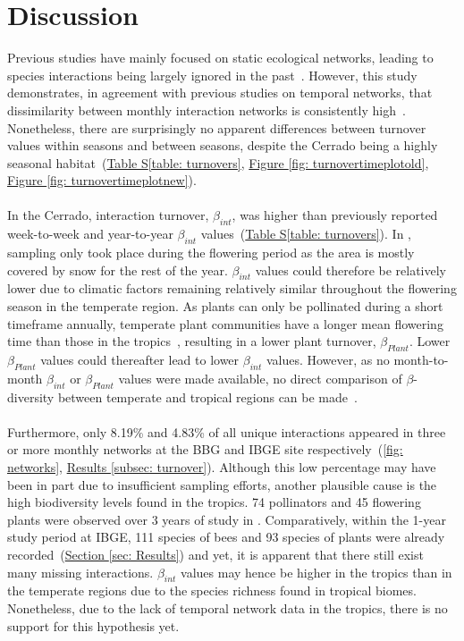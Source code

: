 \documentclass[11pt]{article}
\begin{document}
\newpage
\section{Discussion} %
Previous studies have mainly focused on static ecological networks, leading to species interactions being largely ignored in the past~\citep{Poisot2015}. However, this study demonstrates, in agreement with previous studies on temporal networks, that dissimilarity between monthly interaction networks is consistently high~\citep{Olesen2008, Burkle2013, CaraDonna2017}. Nonetheless, there are surprisingly no apparent differences between turnover values within seasons and between seasons, despite the Cerrado being a highly seasonal habitat~\citep{Kricher2011}(\hyperref[table: turnovers]{Table S\ref{table: turnovers}}, \hyperref[fig: turnovertimeplotold]{Figure \ref{fig: turnovertimeplotold}}, \hyperref[fig: turnovertimeplotnew]{Figure \ref{fig: turnovertimeplotnew}}). \\
\\
In the Cerrado, interaction turnover, $\beta_{int}$, was higher than previously reported week-to-week and year-to-year $\beta_{int}$ values~\citep{CaraDonna2017}(\hyperref[table: turnovers]{Table S\ref{table: turnovers}}). In \cite{CaraDonna2017}, sampling only took place during the flowering period as the area is mostly covered by snow for the rest of the year. $\beta_{int}$ values could therefore be relatively lower due to climatic factors remaining relatively similar throughout the flowering season in the temperate region. As plants can only be pollinated during a short timeframe annually, temperate plant communities have a longer mean flowering time than those in the tropics~\citep{Bawa1990}, resulting in a lower plant turnover, $\beta_{Plant}$. Lower $\beta_{Plant}$ values could thereafter lead to lower $\beta_{int}$ values. However, as no month-to-month $\beta_{int}$ or $\beta_{Plant}$ values were made available, no direct comparison of $\beta$-diversity between temperate and tropical regions can be made~\citep{CaraDonna2017}. \\
\\
Furthermore, only 8.19\% and 4.83\% of all unique interactions appeared in three or more monthly networks at the BBG and IBGE site respectively~(\autoref{fig: networks}, \hyperref[subsec: turnover]{Results \ref{subsec: turnover}}). Although this low percentage may have been in part due to insufficient sampling efforts, another plausible cause is the high biodiversity levels found in the tropics. 74 pollinators and 45 flowering plants were observed over 3 years of study in \cite{CaraDonna2017}. Comparatively, within the 1-year study period at IBGE, 111 species of bees and 93 species of plants were already recorded~(\hyperref[sec: Results]{Section \ref{sec: Results}}) and yet, it is apparent that there still exist many missing interactions. $\beta_{int}$ values may hence be higher in the tropics than in the temperate regions due to the species richness found in tropical biomes. Nonetheless, due to the lack of temporal network data in the tropics, there is no support for this hypothesis yet.\\
\end{document}
